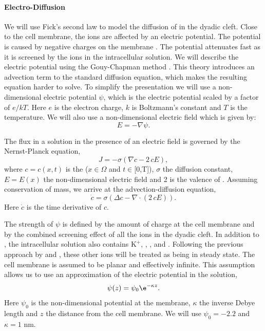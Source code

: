 \paragraph*{Electro-Diffusion}
We will use Fick's second law to model the diffusion of \Ca in the dyadic cleft. Close to the cell membrane, the ions are affected by an electric potential. The potential is caused by negative charges on the membrane \cite{McLaughlinSzaboEtAl1971,LangnerCafisoEtAl1990}. The potential attenuates fast as it is screened by the ions in the intracellular solution. We will describe the electric potential using the Gouy-Chapman method \cite{Grahame1947}. This theory introduces an advection term to the standard diffusion equation, which makes the resulting equation harder to solve. To simplify the presentation we will use a non-dimensional electric potential $\psi$, which is the electric potential scaled by a factor of $e/kT$. Here $e$ is the electron charge, $k$ is Boltzmann's constant and $T$ is the temperature. We will also use a non-dimensional electric field which is given by:
\begin{equation}
  \label{eq:electric_field}
  E=-\nabla\psi.
\end{equation}

The \Ca flux in a solution in the presence of an electric field is governed by the Nernst-Planck equation,
\begin{equation}
  \label{eq:nernst-planck}
  J = -\sigma\left(\nabla c-2\,cE\right),
\end{equation}
where $c = c(x,t)$ is the \CaC ($x\in\Omega$ and $t\in$[0,T]), $\sigma$ the diffusion constant, $E = E(x)$ the non-dimensional electric field and 2 is the valence of \Ca. Assuming conservation of mass, we arrive at the advection-diffusion equation,
\begin{equation}
  \label{eq:advection-diffusion}
  \dot{c}=\sigma\left(\Delta c - \nabla\cdot\left(2\,cE\right)\right).
\end{equation}
Here $\dot{c}$ is the time derivative of $c$.\par

The strength of $\psi$ is defined by the amount of charge at the cell membrane and by the combined screening effect of all the ions in the dyadic cleft. In addition to \Ca, the intracellular solution also contains \ensuremath{\mbox{K}^{+}}, \Na, \Cl, and \Mg. Following the previous approach by \citet{LangnerCafisoEtAl1990} and \citet{SoellerCannell1997}, these other ions will be treated as being in steady state. The cell membrane is assumed to be planar and effectively infinite. This assumption allows us to use an approximation of the electric potential in the solution,
\begin{equation}
  \label{eq:electric_potential}
  \psi(z) = \psi_0\e^{-\kappa{}z}.
\end{equation}
Here $\psi_0$ is the non-dimensional potential at the membrane, $\kappa$ the inverse Debye length and $z$ the distance from the cell membrane. We will use $\psi_0=-2.2$ and $\kappa=1$ nm.\par


